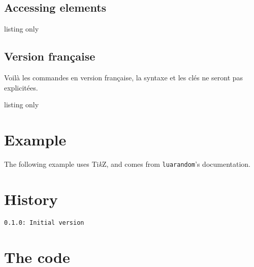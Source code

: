 \documentclass[11pt,a4paper]{ltxdoc}
\providecommand\tikzlogo{Ti\textit{k}Z}
\let\TikZ\tikzlogo
\begin{document}
\subsection{Accessing elements}

\begin{DemoCode}{listing only}
\end{DemoCode}


\subsection{Version française}

Voilà les commandes en version française, la syntaxe et les clés ne seront pas explicitées.

\begin{DemoCode}{listing only}
\ListeRandint[Min=...,Max=...,Nb=...,Repet=...,Graine=...,Tri=...,Sep=...]{\macro}

\end{DemoCode}

\begin{DemoCode}{}
\ListeRandint[Min=5,Max=15,Nb=7,Repet,Tri=croiss,Sep={/}]{\maliste}\maliste

\end{DemoCode}

\pagebreak

\section{Example}

The following example uses \TikZ, and comes from \texttt{luarandom}'s documentation.

\begin{DemoCode}{}
\end{DemoCode}

\pagebreak

\section{History}

\texttt{0.1.0: Initial version}

\section{The code}

\end{document}
